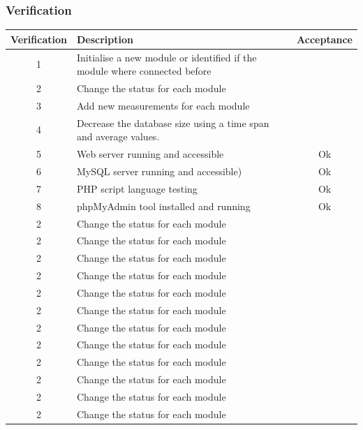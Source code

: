 \subsubsection{Verification}
\begin{table}[H]
\centering
	\begin{tabular}{| c | l | c |}
		\hline
		Verification & Description & Acceptance \\\hline
		1 & Initialise a new module or identified if the module where connected before & ~ \\\hline
		2 & Change the status for each module & ~ \\\hline
		3 & Add new measurements for each module & ~ \\\hline
		4 & Decrease the database size using a time span and average values. & ~ \\\hline
		5 & Web server running and accessible & Ok \\\hline
		6 & MySQL server running and accessible) & Ok \\\hline
		7 & PHP script language testing & Ok \\\hline
		8 & phpMyAdmin tool installed and running & Ok \\\hline
		2 & Change the status for each module & ~ \\\hline
		2 & Change the status for each module & ~ \\\hline
		2 & Change the status for each module & ~ \\\hline
		2 & Change the status for each module & ~ \\\hline
		2 & Change the status for each module & ~ \\\hline
		2 & Change the status for each module & ~ \\\hline
		2 & Change the status for each module & ~ \\\hline
		2 & Change the status for each module & ~ \\\hline
		2 & Change the status for each module & ~ \\\hline
		2 & Change the status for each module & ~ \\\hline
		2 & Change the status for each module & ~ \\\hline
		2 & Change the status for each module & ~ \\\hline
	\end{tabular}
\end{table}



